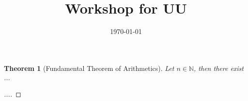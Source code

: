 \documentclass[reqno]{amsart}
\title{Workshop for UU}
\author{}
\date{\today}
\newtheorem{theorem}{Theorem}
\newcommand{\<}{\langle}
\renewcommand{\>}{\rangle}
\renewcommand{\>}{\rangle}
\begin{document}
\maketitle

\begin{theorem}[Fundamental Theorem of Arithmetics]
Let $n \in \mathbb{N}$, then there exist ...

\end{theorem}
\begin{proof}
[...]

\end{proof}


%
%
\end{document}
